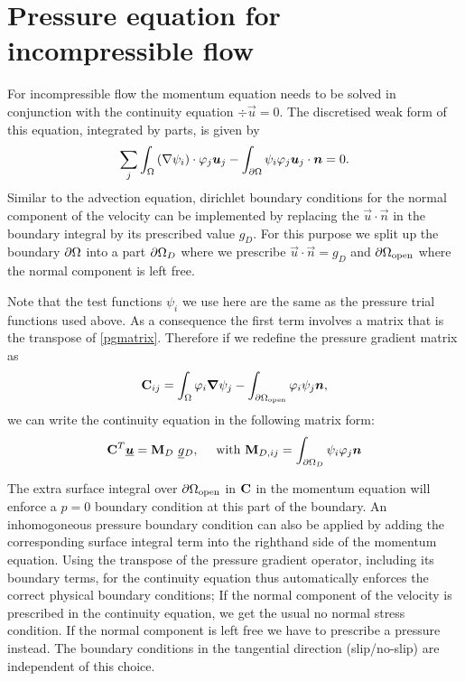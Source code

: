 \section{Pressure equation for incompressible flow}
For incompressible flow the momentum equation needs to be solved 
in conjunction with the continuity equation 
$\div\vec u=0$. The discretised weak form of 
this equation, integrated by parts, is given by
\begin{equation*}
  \sum_j \int_\Omega \left(\nabla\psi_i\right)\cdot\varphi_j {\mbox{\boldmath$u$}}_j - 
    \int_{\partial\Omega} \psi_i\varphi_j {\mbox{\boldmath$u$}}_j\cdot{\mbox{\boldmath$n$}} = 0.
\end{equation*}
Similar to the advection equation, dirichlet boundary conditions for the 
normal component of the velocity can be implemented by replacing
the $\vec u\cdot\vec n$ in the boundary integral by its prescribed 
value $g_D$. For this purpose we split up the 
boundary ${\partial\Omega}$ into a part
${\partial\Omega}_D$ where we prescribe $\vec u\cdot\vec n=g_D$ and 
${\partial\Omega}_{\mathrm{open}}$ where the normal component is left free.

Note that the test functions $\psi_i$ we use here are the 
same as the pressure trial functions used above. As a consequence
the first term involves a matrix that is the
transpose of \eqref{pgmatrix}. Therefore if we redefine the pressure 
gradient matrix as
\begin{equation*}
  {\mbox{\boldmath$\mathrm{C}$}}_{ij}=\int_\Omega \varphi_i{\mbox{\boldmath$\nabla$}}\psi_j 
    -\int_{{\partial\Omega}_{\mathrm{open}}} \varphi_i\psi_j {\mbox{\boldmath$n$}},
\end{equation*}
we can write the continuity equation in the following matrix form:
\begin{equation*}
  {\mbox{\boldmath$\mathrm{C}$}}^T \underline{{\mbox{\boldmath$u$}}}=
    {\mbox{\boldmath$\mathrm{M}$}}_D ~\underline{g}{}_D, 
    \quad\text{ with }
    {\mbox{\boldmath$\mathrm{M}$}}_{D,ij}=\int_{{\partial\Omega}_D} \psi_i\varphi_j{\mbox{\boldmath$n$}}
\end{equation*}

The extra surface integral over ${\partial\Omega}_{\mathrm{open}}$ in 
${\mbox{\boldmath$\mathrm{C}$}}$ in the momentum equation will enforce
a $p=0$ boundary condition at this part of the boundary. An inhomogoneous 
pressure boundary condition can also be applied by adding the corresponding
surface integral term into the righthand side of the momentum equation.
Using the transpose of the pressure gradient operator, including its
boundary terms, for the continuity equation thus automatically 
enforces the correct physical boundary conditions; If the normal 
component of the velocity is prescribed in the continuity equation, 
we get the usual no normal stress condition. If the normal component 
is left free we have to prescribe a pressure instead. The boundary 
conditions in the tangential direction (slip/no-slip) are independent of this choice.

